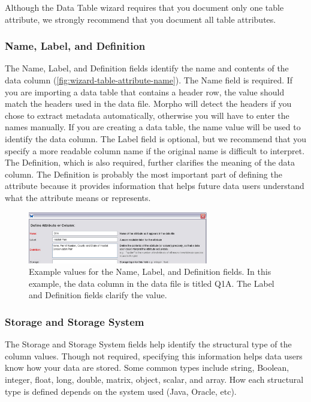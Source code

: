Although the Data Table wizard requires that you document only one table
attribute, we strongly recommend that you document all table attributes.

\subsubsection*{Name, Label, and Definition}
\label{sec:table-attribute-name}

The Name, Label, and Definition fields identify the name and contents of
the data column (\autoref{fig:wizard-table-attribute-name}). The Name
field is required. If you are importing a data table that contains a
header row, the value should match the headers used in the data file.
Morpho will detect the headers if you chose to extract metadata
automatically, otherwise you will have to enter the names manually. If
you are creating a data table, the name value will be used to identify
the data column. The Label field is optional, but we recommend that you
specify a more readable column name if the original name is difficult to
interpret. The Definition, which is also required, further clarifies the
meaning of the data column. The Definition is probably the most
important part of defining the attribute because it provides information
that helps future data users understand what the attribute means or
represents.

\begin{figure}
  \centering
    \includegraphics[width=0.7\textwidth]{images/wizard-table-attribute-name.jpg}
  \caption{Example values for the Name, Label, and Definition fields. In
    this example, the data column in the data file is titled Q1A. The
    Label and Definition fields clarify the value.}
  \label{fig:wizard-table-attribute-name}
\end{figure}

\subsubsection*{Storage and Storage System}
\label{sec:table-attribute-storage}

The Storage and Storage System fields help identify the structural type
of the column values. Though not required, specifying this information
helps data users know how your data are stored. Some common types
include string, Boolean, integer, float, long, double, matrix, object,
scalar, and array. How each structural type is defined depends on the
system used (Java, Oracle, etc). 

